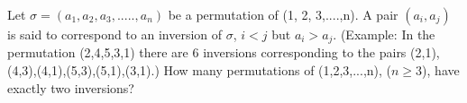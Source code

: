 \item Let $\sigma = (a_1, a_2, a_3,.....,a_n)$ be a permutation of (1, 2, 3,....,n). A pair $(a_i, a_j)$ is said to correspond to an inversion of $\sigma$, $i < j$ but $a_i > a_j$. (Example: In the permutation (2,4,5,3,1) there are 6 inversions corresponding to the pairs (2,1), (4,3),(4,1),(5,3),(5,1),(3,1).) How many permutations of (1,2,3,...,n), ($n \geq 3$), have exactly two inversions?
 






